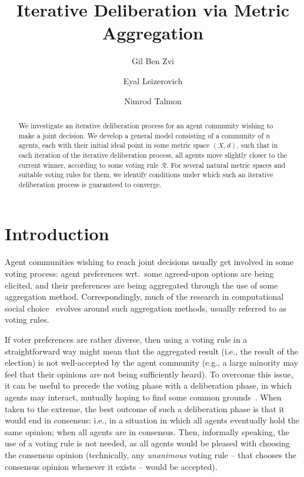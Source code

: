 \documentclass[runningheads,envcountsame]{llncs}
\title{Iterative Deliberation via Metric Aggregation}
\author{Gil Ben Zvi\inst{2} \and Eyal Leizerovich\inst{1} \and Nimrod Talmon\inst{1}}
\institute{Ben-Gurion University \and NRGene LTD}
\begin{document}
\maketitle


\begin{abstract}
%
We investigate an iterative deliberation process for an agent community wishing to make a joint decision.
%
We develop a general model consisting of a community of $n$ agents, each with their initial ideal point in some metric space $(X, d)$, such that in each iteration of the iterative deliberation process, all agents move slightly closer to the current winner, according to some voting rule $\mathcal{R}$.
%
For several natural metric spaces and suitable voting rules for them, we identify conditions under which such an iterative deliberation process is guaranteed to converge.
%
\end{abstract}


\section{Introduction}\label{section:introduction}

Agent communities wishing to reach joint decisions usually get involved in some voting process:
  agent preferences wrt.\ some agreed-upon options are being elicited, and their preferences are being aggregated through the use of some aggregation method.
Correspondingly, much of the research in computational social choice~\cite{moulin2016handbook} evolves around such aggregation methods, usually referred to as voting rules.

If voter preferences are rather diverse, then using a voting rule in a straightforward way might mean that the aggregated result (i.e., the result of the election) is not well-accepted by the agent community (e.g., a large minority may feel that their opinions are not being sufficiently heard).
%
To overcome this issue, it can be useful to precede the voting phase with a deliberation phase, in which agents may interact, mutually hoping to find some common grounds~\cite{cohen1989deliberation}.
%
When taken to the extreme, the best outcome of such a deliberation phase is that it would end in consensus:
  i.e., in a situation in which all agents eventually hold the same opinion; when all agents are in consensus. Then, informally speaking, the use of a voting rule is not needed, as all agents would be pleased with choosing the consensus opinion (technically, any \emph{unanimous} voting rule -- that chooses the consensus opinion whenever it exists -- would be accepted).
\end{document}
